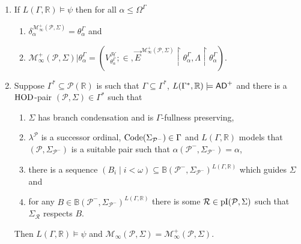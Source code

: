 \documentclass[../main]{subfiles}
\begin{document}
{\begin{enumerate}
  \item If $L(\Gamma, \mathbb{R}) \models \psi$  then for all $\alpha \le \Omega^{\Gamma}$
    \begin{enumerate}
    \item $\delta_{\alpha}^{\mathcal{M}^{+}_{\infty}(\mathcal{P}, \Sigma)}
      = \theta^{\Gamma}_{\alpha}$ and
    \item
      $\mathcal{M}^{+}_{\infty}(\mathcal{P}, \Sigma) |
      \theta^{\Gamma}_{\alpha} =
      (V^{\mathcal{H}}_{\theta^{\Gamma}_{\alpha}};\in,
      \vec{E}^{\mathcal{M}^{+}_{\infty}(\mathcal{P}, \Sigma)}
      \restriction \theta^{\Gamma}_{\alpha}, \Lambda \restriction
      \theta^{\Gamma}_{\alpha})$.
    \end{enumerate}
  \item Suppose $\Gamma^{*} \subseteq \mathcal{P}(\mathbb{R})$ is such
    that $\Gamma \subseteq \Gamma^{*}$,
    $L(\Gamma^{*}, \mathbb{R}) \models \textsf{AD}^{+}$ and there is a
    $\operatorname{HOD}$-pair $(\mathcal{P}, \Sigma) \in \Gamma^{*}$ such that
    \begin{enumerate}
    \item $\Sigma$ has branch condensation and is $\Gamma$-fullness preserving,
    \item $\lambda^{\mathcal{P}}$ is a successor ordinal,
      $\operatorname{Code}(\Sigma_{\mathcal{P}^{-}}) \in \Gamma$ and
      $L(\Gamma, \mathbb{R})$ models that $(\mathcal{P}, \Sigma_{\mathcal{P}^{-}})$ is a suitable pair such that
      $\alpha(\mathcal{P}^{-}, \Sigma_{\mathcal{P}^{-}}) = \alpha$, 
    \item there is a sequence
      $(B_{i} \mid i < \omega) \subseteq \mathbb{B}(\mathcal{P}^{-},
      \Sigma_{\mathcal{P}^{-}})^{L(\Gamma, \mathbb{R})}$ which guides
      $\Sigma$ and 
    \item for any
      $B \in \mathbb{B}(\mathcal{P}^{-},
      \Sigma_{\mathcal{P}^{-}})^{L(\Gamma, \mathbb{R})}$ there is some
      $\mathcal{R} \in \operatorname{pI}(\mathcal{P}, \Sigma)$ such that
      $\Sigma_{\mathcal{R}}$ respects $B$. 
    \end{enumerate}
    Then $L(\Gamma, \mathbb{R}) \models \psi$ and
    $\mathcal{M}_{\infty}(\mathcal{P}, \Sigma) =
    \mathcal{M}^{+}_{\infty}(\mathcal{P}, \Sigma)$.
  \end{enumerate}
}

\end{document}
